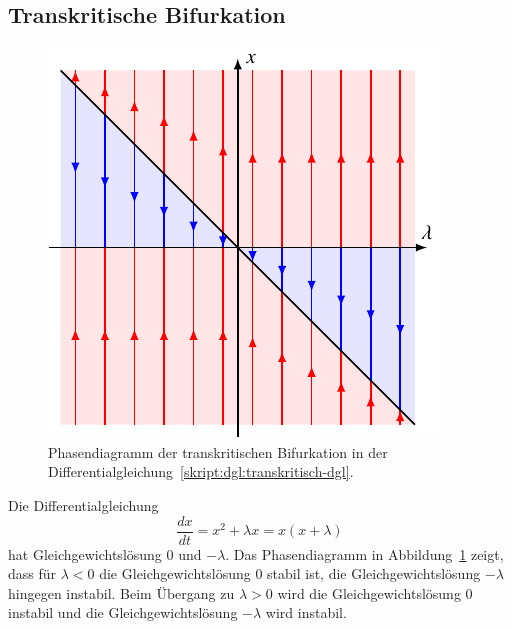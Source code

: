 \subsection{Transkritische Bifurkation}
\begin{figure}
\centering
\includegraphics{chapters/3/trans.pdf}
\caption{Phasendiagramm der transkritischen Bifurkation in der
Differentialgleichung~\eqref{skript:dgl:transkritisch-dgl}.
\label{skript:dgl:transfig}}
\end{figure}
Die Differentialgleichung
\begin{equation}
\frac{dx}{dt}
=
x^2 + \lambda x
=
x(x+\lambda)
\label{skript:dgl:transkritisch-dgl}
\end{equation}
hat Gleichgewichtslösung $0$ und $-\lambda$.
Das Phasendiagramm in Abbildung~\ref{skript:dgl:transfig} zeigt, dass 
für $\lambda<0$ die Gleichgewichtslösung $0$ stabil ist, die
Gleichgewichtslösung $-\lambda$ hingegen instabil.
Beim Übergang zu $\lambda>0$ wird die Gleichgewichtslösung $0$ instabil
und die Gleichgewichtslösung $-\lambda$ wird instabil.

